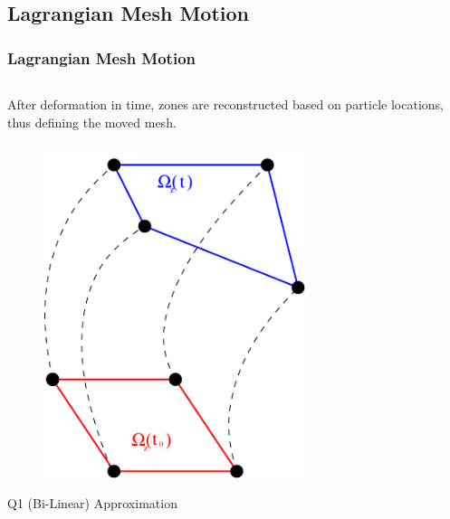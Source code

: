\documentclass[notes=hide,8pt,xcolor=svgnames]{beamer}
\begin{document}
\subsection{Lagrangian Mesh Motion}


\begin{frame}
 \frametitle{Lagrangian Mesh Motion}
 \begin{columns}[T]
  \begin{column}{0.6\textwidth}
   After deformation in time, zones are reconstructed based on particle locations, thus defining the moved mesh.
   \begin{columns}[b]
   \begin{column}{0.5\textwidth}
   \begin{figure}[h!]
    \centering
    \includegraphics[width=0.9\textwidth,keepaspectratio=true]{figures/Motion-Q1.pdf}
    \end{figure}
    \parbox{0.8\textwidth}{\centering \small
    Q1 (Bi-Linear) Approximation}
    \end{column}
    \begin{column}{0.5\textwidth}
    \begin{figure}[h!]
    \centering

\end{figure}
\end{column}
\end{columns}
\end{column}
\end{columns}
\end{frame}
\end{document}
